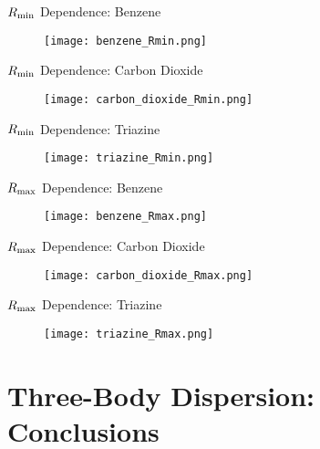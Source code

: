 \documentclass{beamer}
\begin{document}
    \begin{frame}{$R_{\rm{min}}$ Dependence: Benzene}
        \begin{figure}
            \centering
            \texttt{[image: benzene\_Rmin.png]}
        \end{figure}
    \end{frame}

    \begin{frame}{$R_{\rm{min}}$ Dependence: Carbon Dioxide}
        \begin{figure}
            \centering
            \texttt{[image: carbon\_dioxide\_Rmin.png]}
        \end{figure}
    \end{frame}

    \begin{frame}{$R_{\rm{min}}$ Dependence: Triazine}
        \begin{figure}
            \centering
            \texttt{[image: triazine\_Rmin.png]}
        \end{figure}
    \end{frame}

    \begin{frame}{$R_{\rm{max}}$ Dependence: Benzene}
        \begin{figure}
            \centering
            \texttt{[image: benzene\_Rmax.png]}
        \end{figure}
    \end{frame}

    \begin{frame}{$R_{\rm{max}}$ Dependence: Carbon Dioxide}
        \begin{figure}
            \centering
            \texttt{[image: carbon\_dioxide\_Rmax.png]}
        \end{figure}
    \end{frame}

    \begin{frame}{$R_{\rm{max}}$ Dependence: Triazine}
        \begin{figure}
            \centering
            \texttt{[image: triazine\_Rmax.png]}
        \end{figure}
    \end{frame}
    
\section{Three-Body Dispersion: Conclusions}
\end{document}
